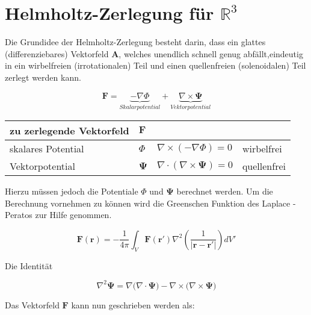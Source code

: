 %
%
%
%
\section{Helmholtz-Zerlegung für $\mathbb{R}^3$
\label{helmholtz:section:teil2}}

Die Grundidee der Helmholtz-Zerlegung besteht darin, dass ein glattes (differenziebares) Vektorfeld $\mathbf{A}$, welches unendlich schnell genug abfällt,eindeutig in ein wirbelfreien (irrotationalen) Teil und einen quellenfreien (solenoidalen) Teil zerlegt werden kann.

\begin{equation}
\mathbf{F} =  \underbrace{-\nabla \Phi}_{Skalarpotential} + \underbrace{\nabla \times \mathbf{\Psi}}_{Vektorpotential}
\label{helmholtz:equationAllgemein}
\end{equation}


\begin{tabular}[h]{l|l|l|l}
\hline
zu zerlegende Vektorfeld & $\mathbf{F}$ & & \\
\hline 
skalares Potential & $\Phi $ & $\nabla \times (-\nabla \Phi) = 0$ & wirbelfrei\\
\hline
Vektorpotential & $\mathbf{\Psi}$ & $\nabla \cdot (\nabla \times \mathbf{\Psi}) = 0$ & quellenfrei\\
\hline
\end{tabular}\newline



Hierzu müssen jedoch die Potentiale $\Phi $ und $\mathbf{\Psi}$ berechnet werden. Um die Berechnung vornehmen zu können wird die Greenschen Funktion des Laplace -Peratos zur Hilfe genommen. 

\begin{equation}
\mathbf{F}(\mathbf{r}) = -\frac{1}{4\pi} \int_V \mathbf{F}(\mathbf{r}') \nabla^2 \left( \frac{1}{|\mathbf{r} - \mathbf{r}'|} \right) dV'
\end{equation}

Die Identität

\begin{equation}
\nabla^2 \mathbf{\Psi}=\nabla \Big( \nabla \cdot \mathbf{\Psi} \Big)-\nabla \times \Big(\nabla \times \mathbf{\Psi} \Big)
\end{equation}

Das Vektorfeld $\mathbf{F}$ kann nun geschrieben werden als:

